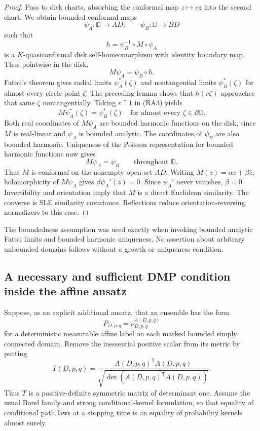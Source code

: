 \documentclass[11pt]{article}
\theoremstyle{definition}\newtheorem{definition}[theorem]{Definition}
\theoremstyle{remark}\newtheorem{remark}[theorem]{Remark}
\begin{document}
\begin{proof}
Pass to disk charts, absorbing the conformal map $z\mapsto cz$ into the
second chart.  We obtain bounded conformal maps
\[
 \psi_A:\mathbb D\to AD,\qquad \psi_B:\mathbb D\to BD
\]
such that
\[
 h=\psi_B^{-1}\circ M\circ\psi_A
\]
is a $K$-quasiconformal disk self-homeomorphism with identity boundary map.
Thus pointwise in the disk,
\[
 M\psi_A=\psi_B\circ h.
 \tag{RA3}
\]
Fatou's theorem gives radial limits $\psi_A^*(\zeta)$ and nontangential
limits $\psi_B^*(\zeta)$ for almost every circle point $\zeta$.
The preceding lemma shows that $h(r\zeta)$ approaches that same $\zeta$
nontangentially.  Taking $r\uparrow1$ in (RA3) yields
\[
 M\psi_A^*(\zeta)=\psi_B^*(\zeta)
 \quad\text{for almost every }\zeta\in\partial\mathbb D.
 \tag{RA4}
\]
Both real coordinates of $M\psi_A$ are bounded harmonic functions on the
disk, since $M$ is real-linear and $\psi_A$ is bounded analytic.
The coordinates of $\psi_B$ are also bounded harmonic.  Uniqueness of the
Poisson representation for bounded harmonic functions now gives
\[
 M\psi_A=\psi_B\qquad\text{throughout }\mathbb D.
\]
Thus $M$ is conformal on the nonempty open set $AD$.  Writing
$M(z)=\alpha z+\beta\bar z$, holomorphicity of $M\psi_A$ gives
$\beta\overline{\psi_A'(z)}=0$.  Since $\psi_A'$ never vanishes,
$\beta=0$.  Invertibility and orientation imply that $M$ is a direct
Euclidean similarity.  The converse is SLE similarity covariance.
Reflections reduce orientation-reversing normalizers to this case.
\end{proof}

The boundedness assumption was used exactly when invoking bounded analytic
Fatou limits and bounded harmonic uniqueness.  No assertion about arbitrary
unbounded domains follows without a growth or uniqueness condition.

\subsection{A necessary and sufficient DMP condition inside the affine ansatz}

Suppose, as an explicit additional ansatz, that an ensemble has the form
\[
 P_{D,p,q}=\nu^{A(D,p,q)}_{D,p,q}
 \tag{RA5}
\]
for a deterministic measurable affine label on each marked bounded simply
connected domain.  Remove the inessential positive scalar from its metric by
putting
\[
 T(D,p,q)=
 \frac{A(D,p,q)^{\mathsf T}A(D,p,q)}
 {\sqrt{\det(A(D,p,q)^{\mathsf T}A(D,p,q))}}.
 \tag{RA6}
\]
Thus $T$ is a positive-definite symmetric matrix of determinant one.
Assume the usual Borel family and strong conditional-kernel formulation, so
that equality of conditional path laws at a stopping time is an equality of
probability kernels almost surely.
\end{document}
